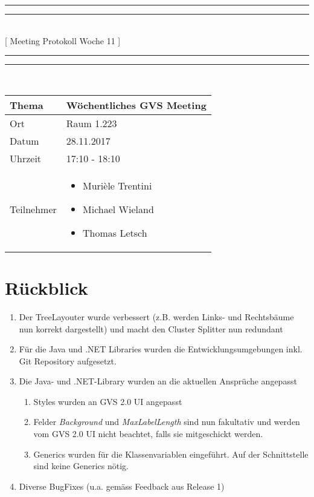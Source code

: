 \documentclass[11pt, a4paper,oneside]{scrartcl}
\begin{document}
	\centering
	\rule{\textwidth}{1.6pt}\vspace*{-\baselineskip}\vspace*{2pt} %
	\rule{\textwidth}{0.4pt}\\[\baselineskip] %
	{\LARGE [ Meeting Protokoll Woche 11 ]}\\[0.2\baselineskip] %
	\rule{\textwidth}{0.4pt}\vspace*{-\baselineskip}\vspace{3.2pt} %
	\rule{\textwidth}{1.6pt}\\[2\baselineskip] %
	
	\begin{tabu} to \linewidth {l X }
		\toprule
		\textbf{Thema} & \textbf{Wöchentliches GVS Meeting} \\
		\midrule
		Ort & Raum 1.223 \\
		Datum & 28.11.2017  \\
		Uhrzeit &  17:10 - 18:10 \\
		Teilnehmer & 
		\begin{minipage}[t]{\textwidth}
			\begin{itemize}
				\item Murièle Trentini
				\item Michael Wieland
				\item Thomas Letsch
			\end{itemize}
		\end{minipage}
		\\
		\bottomrule
	\end{tabu}
	
	
	\section{Rückblick}
	\begin{enumerate}
		\item Der TreeLayouter wurde verbessert (z.B. werden Links- und Rechtsbäume nun korrekt dargestellt) und macht den Cluster Splitter nun redundant 
		\item Für die Java und .NET Libraries wurden die Entwicklungsumgebungen inkl. Git Repository aufgesetzt.
		\item Die Java- und .NET-Library wurden an die aktuellen Ansprüche angepasst
		\begin{enumerate}
			\item Styles wurden an GVS 2.0 UI angepasst
			\item Felder \textit{Background} und \textit{MaxLabelLength} sind nun fakultativ und werden vom GVS 2.0 UI nicht beachtet, falls sie mitgeschickt werden.
			\item Generics wurden für die Klassenvariablen eingeführt. Auf der Schnittstelle sind keine Generics nötig.
		\end{enumerate}
	\item Diverse BugFixes (u.a. gemäss Feedback aus Release 1)
	\end{enumerate}
	
\end{document}
